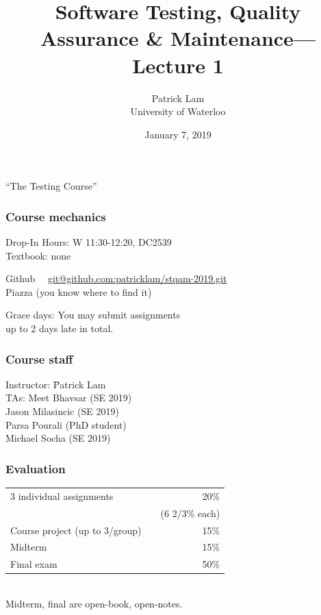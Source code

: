 \documentclass{beamer}
\title{Software Testing, Quality Assurance \& Maintenance---Lecture 1}
\author{Patrick Lam\\University of Waterloo}
\date{January 7, 2019}
\newenvironment{changemargin}[1]{%
  \begin{list}{}{%
    \setlength{\topsep}{0pt}%
    \setlength{\leftmargin}{#1}%
    \setlength{\rightmargin}{1em}
    \setlength{\listparindent}{\parindent}%
    \setlength{\itemindent}{\parindent}%
    \setlength{\parsep}{\parskip}%
  }%
  \item[]}{\end{list}}
\begin{document}
\begin{frame}
  \titlepage
\end{frame}

\begin{frame}
  \begin{center}
  \Huge ``The Testing Course''
  \end{center}
\end{frame}

\begin{frame}
\frametitle{Course mechanics}

\Large

\begin{changemargin}{1em}
  Drop-In Hours: W 11:30-12:20, DC2539\\[1em]
  
  Textbook: none\\[1em]

{\small
  \begin{tabbing}
Github~~ \= \url{git@github.com:patricklam/stqam-2019.git}\\[1em]
Piazza \> (you know where to find it)
  \end{tabbing}
}

  Grace days: You may submit assignments \\ up to 2 days late in total.
\end{changemargin}

\end{frame}

\begin{frame}
\frametitle{Course staff}

\Large
{
  \begin{tabbing}
    Instructor: \= Patrick Lam\\
    TAs: \> Meet Bhavsar (SE 2019) \\
    \> Jason Milasincic (SE 2019) \\
    \> Parsa Pourali (PhD student) \\
    \> Michael Socha (SE 2019)
  \end{tabbing}
}
\end{frame}

\begin{frame}
  \frametitle{Evaluation}
  \Large
\begin{changemargin}{1em}
\begin{tabular}{lr}
3 individual assignments & 20\% \\
& ~~(6 2/3\% each) \\
Course project (up to 3/group) & 15\% \\
Midterm & 15\% \\
Final exam & 50\% \\
\end{tabular}~\\[1em]

Midterm, final are open-book, open-notes.\\[1em]

\end{changemargin}

\end{frame}
\end{document}
